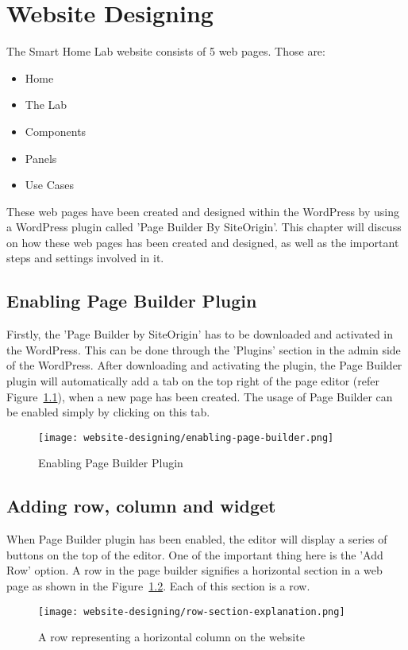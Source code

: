 \chapter{Website Designing}
The Smart Home Lab website consists of 5 web pages. Those are:
\begin{itemize}
\item Home
\item The Lab
\item Components
\item Panels
\item Use Cases
\end{itemize}

These web pages have been created and designed within the WordPress by using a WordPress plugin called 'Page Builder By SiteOrigin'. This chapter will discuss on how these web pages has been created and designed, as well as the important steps and settings involved in it.

\section{Enabling Page Builder Plugin}
Firstly, the 'Page Builder by SiteOrigin' has to be downloaded and activated in the WordPress. This can be done through the 'Plugins' section in the admin side of the WordPress. After downloading and activating the plugin, the Page Builder plugin will automatically add a tab on the top right of the page editor (refer Figure~\ref{enabling-page-builder}), when a new page has been created. The usage of Page Builder can be enabled simply by clicking on this tab.

\begin{figure}[ht]
\centering
\caption{Enabling Page Builder Plugin}
\label{enabling-page-builder}
\texttt{[image: website-designing/enabling-page-builder.png]}
\end{figure}

\section{Adding row, column and widget}
When Page Builder plugin has been enabled, the editor will display a series of buttons on the top of the editor. One of the important thing here is the 'Add Row' option. A row in the page builder signifies a horizontal section in a web page as shown in the Figure~\ref{row-section-explanation}. Each of this section is a row.

\begin{figure}[ht]
\centering
\caption{A row representing a horizontal column on the website}
\label{row-section-explanation}
\texttt{[image: website-designing/row-section-explanation.png]}
\end{figure}

